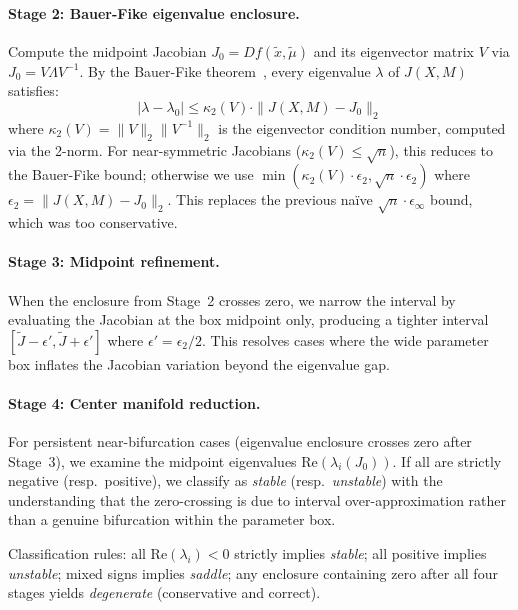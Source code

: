 \documentclass[11pt]{article}
\begin{document}
\paragraph{Stage 2: Bauer-Fike eigenvalue enclosure.}
Compute the midpoint Jacobian $J_0 = Df(\tilde{x}, \tilde{\mu})$ and its eigenvector matrix $V$ via $J_0 = V \Lambda V^{-1}$.
By the Bauer-Fike theorem~\cite{bauer1960norms}, every eigenvalue $\lambda$ of $J(X,M)$ satisfies:
\begin{equation}
|\lambda - \lambda_0| \leq \kappa_2(V) \cdot \|J(X,M) - J_0\|_2
\end{equation}
where $\kappa_2(V) = \|V\|_2 \|V^{-1}\|_2$ is the eigenvector condition number, computed via the 2-norm.
For near-symmetric Jacobians ($\kappa_2(V) \leq \sqrt{n}$), this reduces to the Bauer-Fike bound; otherwise we use $\min(\kappa_2(V) \cdot \epsilon_2, \sqrt{n} \cdot \epsilon_2)$ where $\epsilon_2 = \|J(X,M) - J_0\|_2$.
This replaces the previous na\"ive $\sqrt{n} \cdot \epsilon_\infty$ bound, which was too conservative.

\paragraph{Stage 3: Midpoint refinement.}
When the enclosure from Stage~2 crosses zero, we narrow the interval by evaluating the Jacobian at the box midpoint only, producing a tighter interval $[\tilde{J} - \epsilon', \tilde{J} + \epsilon']$ where $\epsilon' = \epsilon_2 / 2$.
This resolves cases where the wide parameter box inflates the Jacobian variation beyond the eigenvalue gap.

\paragraph{Stage 4: Center manifold reduction.}
For persistent near-bifurcation cases (eigenvalue enclosure crosses zero after Stage~3), we examine the midpoint eigenvalues $\mathrm{Re}(\lambda_i(J_0))$.
If all are strictly negative (resp.\ positive), we classify as \emph{stable} (resp.\ \emph{unstable}) with the understanding that the zero-crossing is due to interval over-approximation rather than a genuine bifurcation within the parameter box.

Classification rules: all $\mathrm{Re}(\lambda_i) < 0$ strictly implies \emph{stable}; all positive implies \emph{unstable}; mixed signs implies \emph{saddle}; any enclosure containing zero after all four stages yields \emph{degenerate} (conservative and correct).
\end{document}
